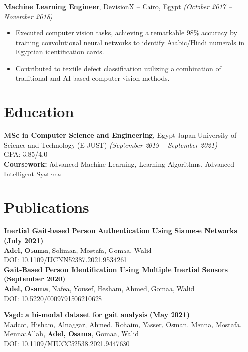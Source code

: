 \documentclass[10pt, letterpaper]{article}
\newenvironment{highlights}{
    \begin{itemize}[topsep=0.1cm, parsep=0.1cm, itemsep=0pt, leftmargin=1em]
}{
    \end{itemize}
}
\begin{document}
\vspace{0.3cm}

\textbf{Machine Learning Engineer}, DevisionX -- Cairo, Egypt \textit{(October 2017 – November 2018)} \\
\begin{highlights}
    \item Executed computer vision tasks, achieving a remarkable $98\%$ accuracy by training convolutional neural networks to identify Arabic/Hindi numerals in Egyptian identification cards.
    \item Contributed to textile defect classification utilizing a combination of traditional and AI-based computer vision methods.
\end{highlights}

\vspace{0.5cm}

\section{Education}
\textbf{MSc in Computer Science and Engineering}, Egypt Japan University of Science and Technology (E-JUST) \textit{(September 2019 – September 2021)} \\
GPA: 3.85/4.0 \\
\textbf{Coursework:} Advanced Machine Learning, Learning Algorithms, Advanced Intelligent Systems

\vspace{0.3cm}

\section{Publications}
\textbf{Inertial Gait-based Person Authentication Using Siamese Networks (July 2021)} \\
\textbf{Adel, Osama}, Soliman, Mostafa, Gomaa, Walid \\
\href{https://doi.org/10.1109/IJCNN52387.2021.9534261}{DOI: 10.1109/IJCNN52387.2021.9534261} \\

\textbf{Gait-Based Person Identification Using Multiple Inertial Sensors (September 2020)} \\
\textbf{Adel, Osama}, Nafea, Yousef, Hesham, Ahmed, Gomaa, Walid \\
\href{https://doi.org/10.5220/0009791506210628}{DOI: 10.5220/0009791506210628}

\textbf{Vsgd: a bi-modal dataset for gait analysis (May 2021)} \\
Madcor, Hisham, Alnaggar, Ahmed, Rohaim, Yasser, Osman, Menna, Mostafa, MennatAllah, \textbf{Adel, Osama}, Gomaa, Walid \\
\href{https://doi.org/10.1109/MIUCC52538.2021.9447630}{DOI: 10.1109/MIUCC52538.2021.9447630}
\end{document}
